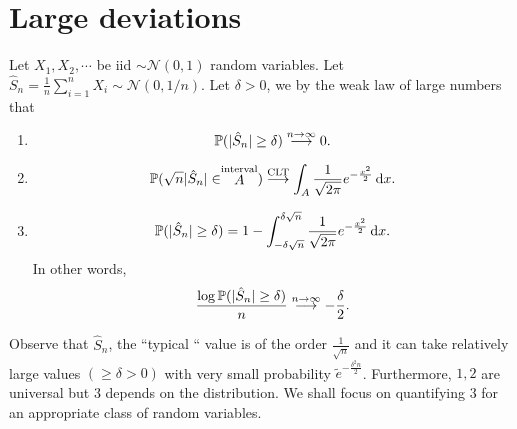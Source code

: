 \documentclass{article}
\begin{document}
\section{Large deviations}\label{sec: large deviations}


Let $ X_{1}, X_{2}, \cdots$ be iid $\sim \mathcal{N}(0,1) $ random variables. Let $ \widehat{S}_{n} = \frac{1}{n}\displaystyle\sum^{n}_{i=1} X_{i} \sim \mathcal{N}(0, 1/n)$. Let $ \delta >0$, we by the weak law of large numbers that 
\begin{enumerate}
	\item 
\[
	\mathbb{P}(|\hat{S}_{n}|\geq \delta)\stackrel{n\to \infty}{\longrightarrow} 0.
\]
\item \[ \mathbb{P}(\sqrt{n}|\hat{S}_{n}|\in \stackrel{\text{interval}}{A}) \stackrel{\text{CLT}}{\longrightarrow} \displaystyle\int_{A} \frac{1}{\sqrt{2\pi}}e^{-\frac{x^{2}}{2}}\operatorname{d}\! x.
	\]
	\item \[ \mathbb{P}(|\hat{S}_{n}|\geq \delta) = 1- \displaystyle\int^{\delta\sqrt{n}}_{-\delta \sqrt{n}} \frac{1}{\sqrt{2\pi}}e^{-\frac{x^{2}}{2}}\operatorname{d}\! x. 
	\]
In other words, 
\[
 \frac{\log \mathbb{P}(|\hat{S}_{n}|\geq \delta)}{n} \stackrel{n\to \infty}{\longrightarrow} -\frac{\delta}{2}.
\]
\end{enumerate}

Observe that $ \hat{S}_{n}$, the ``typical `` value is of the order $ \frac{1}{\sqrt{n}}$ and it can take relatively large values $ (\geq \delta>0)$ with very small probability $ \tilde e^{-\frac{\delta^{2}n}{2}}$. Furthermore, $ 1, 2$ are universal but $ 3$ depends on the distribution. We shall focus on quantifying $ 3$ for an appropriate class of random variables.\\ 
\end{document}
